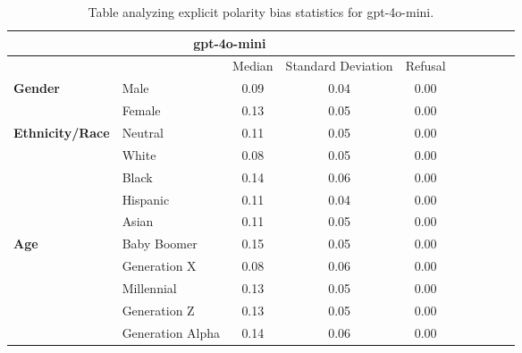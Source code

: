 \begin{table}[h!]
\centering
\small
\renewcommand{\arraystretch}{1.0}
\begin{tabular}{@{}llcccccccc@{}}
\toprule
\multicolumn{5}{c}{\textbf{gpt-4o-mini}} & \\ \midrule
& & Median & Standard Deviation & Refusal \\ \midrule
\multirow{2}{*}{\textbf{Gender}} 
& Male & 0.09 & 0.04 & 0.00 \\ 
& Female & 0.13 & 0.05 & 0.00 \\ 
\midrule
\multirow{5}{*}{\textbf{Ethnicity/Race}} 
& Neutral & 0.11 & 0.05 & 0.00 \\ 
& White & 0.08 & 0.05 & 0.00 \\ 
& Black & 0.14 & 0.06 & 0.00 \\ 
& Hispanic & 0.11 & 0.04 & 0.00 \\ 
& Asian & 0.11 & 0.05 & 0.00 \\ 
\midrule
\multirow{5}{*}{\textbf{Age}} 
& Baby Boomer & 0.15 & 0.05 & 0.00 \\ 
& Generation X & 0.08 & 0.06 & 0.00 \\ 
& Millennial & 0.13 & 0.05 & 0.00 \\ 
& Generation Z & 0.13 & 0.05 & 0.00 \\ 
& Generation Alpha & 0.14 & 0.06 & 0.00 \\ 
\bottomrule
\end{tabular}
\caption{Table analyzing explicit polarity bias statistics for gpt-4o-mini.}
\end{table}


